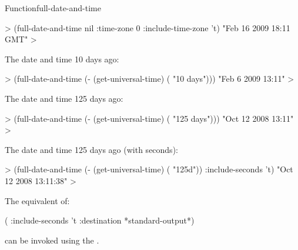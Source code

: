 \documentclass[10pt,twoside,english,pdftex]{article}
\begin{document}
\begin{functiondoc}{Function}{full-date-and-time}
\begin{example}
  > (full-date-and-time nil 
      :time-zone 0 
      :include-time-zone 't)
  "Feb 16 2009 18:11 GMT"
  >
\end{example}
%
The date and time 10 days ago:
%
%
\W\supp\notpretop
\begin{example}
  > (full-date-and-time (- (get-universal-time) ( "10 days")))
  "Feb  6 2009 13:11"
  >
\end{example}
%
The date and time 125 days ago:
%
\W\supp\notpretop
\begin{example}
  > (full-date-and-time (- (get-universal-time) ( "125 days")))
  "Oct 12 2008 13:11"
  >
\end{example}
%
The date and time 125 days ago (with seconds):
%
\W\supp\notpretop
\begin{example}
  > (full-date-and-time (- (get-universal-time) ( "125d"))
      :include-seconds 't)
  "Oct 12 2008 13:11:38"
  >
\end{example}

\replnote 
%
%
%
The equivalent of:
%
\W\supp
\begin{example}
  (  
     :include-seconds 't
     :destination *standard-output*)
\end{example} 
%
can be invoked using the  .

\end{functiondoc}

\end{document}
